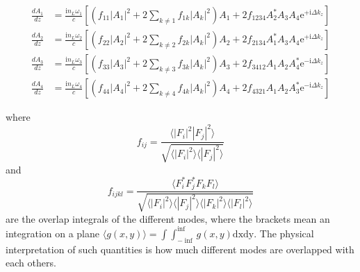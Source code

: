 \documentclass[12pt,a4paper,twoside]{article}
\begin{document}
\begin{subequations}
\begin{align}
	\frac{dA_1}{dz} &= \frac{\mathrm{i}n_L\omega_1}{c}\left[ \left( f_{11} |A_1|^2 + 2 \sum_{k\neq1} f_{1k}|A_k|^2\right)A_1 + 2f_{1234}A_2^*A_3A_4\mathrm{e}^{+\mathrm{i}\Delta k_z} \right]
		\label{eq_coupled_amplitude_a}\\
	\frac{dA_2}{dz} &= \frac{\mathrm{i}n_L\omega_2}{c}\left[ \left( f_{22} |A_2|^2 + 2 \sum_{k\neq2} f_{2k}|A_k|^2\right)A_2 + 2f_{2134}A_1^*A_3A_4\mathrm{e}^{+\mathrm{i}\Delta k_z} \right]
		\label{eq_coupled_amplitude_b}\\
	\frac{dA_3}{dz} &= \frac{\mathrm{i}n_L\omega_3}{c}\left[ \left( f_{33} |A_3|^2 + 2 \sum_{k\neq3} f_{3k}|A_k|^2\right)A_3 + 2f_{3412}A_1A_2A_4^*\mathrm{e}^{-\mathrm{i}\Delta k_z} \right]
		\label{eq_coupled_amplitude_c}\\
	\frac{dA_4}{dz} &= \frac{\mathrm{i}n_L\omega_4}{c}\left[ \left( f_{44} |A_4|^2 + 2 \sum_{k\neq4} f_{4k}|A_k|^2\right)A_4 + 2f_{4321}A_1A_2A_3^*\mathrm{e}^{-\mathrm{i}\Delta k_z} \right]
		\label{eq_coupled_amplitude_d}
\end{align}
\label{eq_coupled}
\end{subequations}

where
\begin{equation}
	f_{ij} = \frac{\langle |F_i|^2 |F_j|^2 \rangle}{\sqrt{\langle |F_i|^2 \rangle\langle |F_j|^2 \rangle}}
\end{equation}
\hspace{18pt}and
\begin{equation}
	f_{ijkl} = \frac{\langle F_i^* F_j^* F_k F_l \rangle}{\sqrt{\langle |F_i|^2 \rangle\langle |F_j|^2 \rangle\langle |F_k|^2 \rangle\langle |F_l|^2 \rangle}}
\end{equation}
\hspace{18pt}are the overlap integrals of the different modes, where the brackets mean an integration on a plane $\langle g(x,y)\rangle = \int\int_{-\inf}^{\inf}g(x,y)\mathrm{dxdy}$.
The physical interpretation of such quantities is how much different modes are overlapped with each others.
\end{document}

